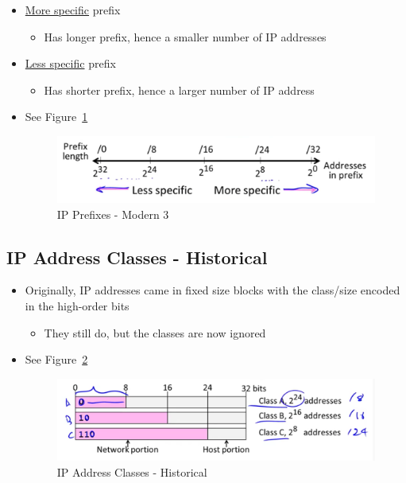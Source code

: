 \documentclass[12pt]{ctexart}   %
\begin{document}
\begin{itemize}
		 \item \underline{More specific} prefix
		 \begin{itemize}
		 	\item Has longer prefix, hence a smaller number of IP addresses
		 \end{itemize}
		 
		 \item \underline{Less specific} prefix
		 \begin{itemize}
		 	\item Has shorter prefix, hence a larger number of IP address
		\end{itemize}	
		\item See Figure~\ref{fig:4-4-5}
		
		\begin{figure}[h!] %
		\centering
		 \includegraphics[scale=0.7]{images/4-4-5}
		\caption{IP Prefixes - Modern 3}
		 \label{fig:4-4-5}
		 \end{figure}	 		 
	\end{itemize}
	
	\subsection{IP Address Classes - Historical}
	\begin{itemize}
		\item Originally, IP addresses came in fixed size blocks with the class/size encoded in the high-order bits
		\begin{itemize}
			\item They still do, but the classes are now ignored
		\end{itemize}
		\item See Figure~\ref{fig:4-4-6}
		
		\begin{figure}[h!] %
		\centering
		 \includegraphics[scale=0.7]{images/4-4-6}
		\caption{IP Address Classes - Historical}
		 \label{fig:4-4-6}
		 \end{figure}	 	
	\end{itemize}
	
\end{document}
